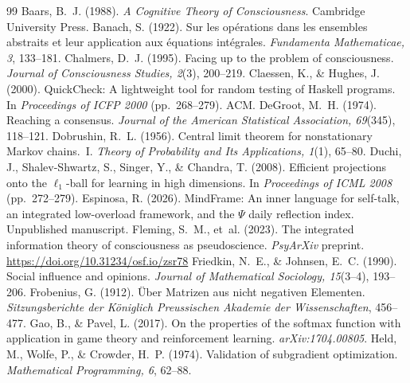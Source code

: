 \documentclass[11pt]{article}
\theoremstyle{definition}
\theoremstyle{remark}
\begin{document}
\begin{thebibliography}{99}
 Baars, B.~J. (1988). \emph{A Cognitive Theory of Consciousness}. Cambridge University Press.
 Banach, S. (1922). Sur les op\'erations dans les ensembles abstraits et leur application aux \'equations int\'egrales. \emph{Fundamenta Mathematicae, 3}, 133--181.
 Chalmers, D.~J. (1995). Facing up to the problem of consciousness. \emph{Journal of Consciousness Studies, 2}(3), 200--219.
 Claessen, K., \& Hughes, J. (2000). QuickCheck: A lightweight tool for random testing of Haskell programs. In \emph{Proceedings of ICFP 2000} (pp.~268--279). ACM.
 DeGroot, M.~H. (1974). Reaching a consensus. \emph{Journal of the American Statistical Association, 69}(345), 118--121.
 Dobrushin, R.~L. (1956). Central limit theorem for nonstationary Markov chains.~I. \emph{Theory of Probability and Its Applications, 1}(1), 65--80.
 Duchi, J., Shalev-Shwartz, S., Singer, Y., \& Chandra, T. (2008). Efficient projections onto the $\ell_1$-ball for learning in high dimensions. In \emph{Proceedings of ICML 2008} (pp.~272--279).
 Espinosa, R. (2026). MindFrame: An inner language for self-talk, an integrated low-overload framework, and the $\Psi$ daily reflection index. Unpublished manuscript.
 Fleming, S.~M., et~al. (2023). The integrated information theory of consciousness as pseudoscience. \emph{PsyArXiv} preprint. \url{https://doi.org/10.31234/osf.io/zsr78}
 Friedkin, N.~E., \& Johnsen, E.~C. (1990). Social influence and opinions. \emph{Journal of Mathematical Sociology, 15}(3--4), 193--206.
 Frobenius, G. (1912). \"Uber Matrizen aus nicht negativen Elementen. \emph{Sitzungsberichte der K\"oniglich Preussischen Akademie der Wissenschaften}, 456--477.
 Gao, B., \& Pavel, L. (2017). On the properties of the softmax function with application in game theory and reinforcement learning. \emph{arXiv:1704.00805}.
 Held, M., Wolfe, P., \& Crowder, H.~P. (1974). Validation of subgradient optimization. \emph{Mathematical Programming, 6}, 62--88.

\end{thebibliography}
\end{document}
